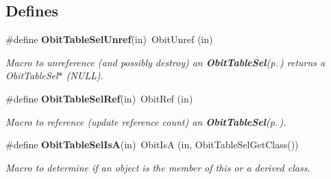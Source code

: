 \subsection*{Defines}
\begin{CompactItemize}
\item 
\#define {\bf Obit\-Table\-Sel\-Unref}(in)\ Obit\-Unref (in)
\begin{CompactList}\small\item\em Macro to unreference (and possibly destroy) an {\bf Obit\-Table\-Sel}{\rm (p.\,\pageref{structObitTableSel})} returns a Obit\-Table\-Sel$\ast$ (NULL). \item\end{CompactList}\item 
\#define {\bf Obit\-Table\-Sel\-Ref}(in)\ Obit\-Ref (in)
\begin{CompactList}\small\item\em Macro to reference (update reference count) an {\bf Obit\-Table\-Sel}{\rm (p.\,\pageref{structObitTableSel})}. \item\end{CompactList}\item 
\#define {\bf Obit\-Table\-Sel\-Is\-A}(in)\ Obit\-Is\-A (in, Obit\-Table\-Sel\-Get\-Class())
\begin{CompactList}\small\item\em Macro to determine if an object is the member of this or a derived class. \item\end{CompactList}\end{CompactItemize}
